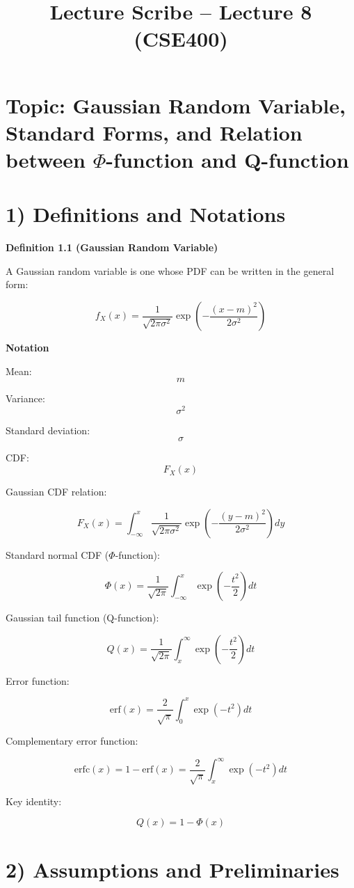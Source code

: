 \documentclass[12pt]{article}
\title{Lecture Scribe -- Lecture 8 (CSE400)}
\author{}
\date{}
\begin{document}
\maketitle

\section*{Topic: Gaussian Random Variable, Standard Forms, and Relation between $\Phi$-function and Q-function}

\section*{1) Definitions and Notations}

\textbf{Definition 1.1 (Gaussian Random Variable)}

A Gaussian random variable is one whose PDF can be written in the general form:

\[
f_X(x)
=
\frac{1}{\sqrt{2\pi\sigma^2}}
\exp
\left(
-
\frac{(x-m)^2}{2\sigma^2}
\right)
\]

\textbf{Notation}

Mean:
\[
m
\]

Variance:
\[
\sigma^2
\]

Standard deviation:
\[
\sigma
\]

CDF:
\[
F_X(x)
\]

Gaussian CDF relation:

\[
F_X(x)
=
\int_{-\infty}^{x}
\frac{1}{\sqrt{2\pi\sigma^2}}
\exp
\left(
-
\frac{(y-m)^2}{2\sigma^2}
\right)
dy
\]

Standard normal CDF ($\Phi$-function):

\[
\Phi(x)
=
\frac{1}{\sqrt{2\pi}}
\int_{-\infty}^{x}
\exp
\left(
-
\frac{t^2}{2}
\right)
dt
\]

Gaussian tail function (Q-function):

\[
Q(x)
=
\frac{1}{\sqrt{2\pi}}
\int_{x}^{\infty}
\exp
\left(
-
\frac{t^2}{2}
\right)
dt
\]

Error function:

\[
\mathrm{erf}(x)
=
\frac{2}{\sqrt{\pi}}
\int_{0}^{x}
\exp(-t^2)
dt
\]

Complementary error function:

\[
\mathrm{erfc}(x)
=
1 - \mathrm{erf}(x)
=
\frac{2}{\sqrt{\pi}}
\int_{x}^{\infty}
\exp(-t^2)
dt
\]

Key identity:

\[
Q(x)
=
1 - \Phi(x)
\]

\section*{2) Assumptions and Preliminaries}
\end{document}

